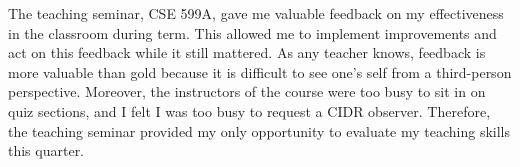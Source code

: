 \documentclass{article}
\begin{document}
The teaching seminar, CSE 599A, gave me valuable feedback on my
effectiveness in the classroom during term. This allowed me to implement
improvements and act on this feedback while it still mattered. As any
teacher knows, feedback is more valuable than gold because it is
difficult to see one's self from a third-person perspective.
Moreover, the instructors of the course were too busy to sit in on
quiz sections, and I felt I was too busy to request a CIDR observer.
Therefore, the teaching seminar provided my only opportunity to
evaluate my teaching skills this quarter.
\end{document}
